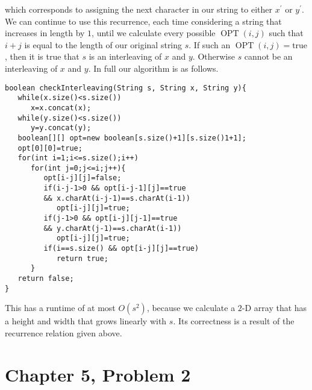\documentclass[12pt]{article}
\begin{document}
which corresponds to assigning the next character in our string to either \(x^\prime\) or \(y^\prime\). We can continue to use this recurrence,
each time considering a string that increases in length by \(1\), until we calculate every possible \(\operatorname{OPT}(i,j)\) such that \(i+j\) is
equal to the length of our original string \(s\). If such an \(\operatorname{OPT}(i,j)=\text{true}\), then it is true that \(s\) is an interleaving
of \(x\) and \(y\). Otherwise \(s\) cannot be an interleaving of \(x\) and \(y\). In full our algorithm is as follows.

\begin{verbatim}
boolean checkInterleaving(String s, String x, String y){
   while(x.size()<s.size())
      x=x.concat(x);
   while(y.size()<s.size())
      y=y.concat(y);
   boolean[][] opt=new boolean[s.size()+1][s.size()1+1];
   opt[0][0]=true;
   for(int i=1;i<=s.size();i++)
      for(int j=0;j<=i;j++){
         opt[i-j][j]=false;
         if(i-j-1>0 && opt[i-j-1][j]==true
         && x.charAt(i-j-1)==s.charAt(i-1))
            opt[i-j][j]=true;
         if(j-1>0 && opt[i-j][j-1]==true
         && y.charAt(j-1)==s.charAt(i-1))
            opt[i-j][j]=true;
         if(i==s.size() && opt[i-j][j]==true)
            return true;
      }
   return false;
}
\end{verbatim}
This has a runtime of at most \(O(s^2)\), because we calculate a \(2\)-D array that has a height and width that grows linearly with \(s\). Its correctness
is a result of the recurrence relation given above.

\pagebreak

\section*{Chapter 5, Problem 2}
\end{document}
